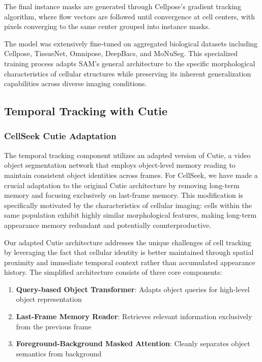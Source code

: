 \documentclass[../cellseek_paper.tex]{subfiles}
\begin{document}
The final instance masks are generated through Cellpose's gradient tracking algorithm, where flow vectors are followed until convergence at cell centers, with pixels converging to the same center grouped into instance masks.

The model was extensively fine-tuned on aggregated biological datasets including Cellpose, TissueNet, Omnipose, DeepBacs, and MoNuSeg. This specialized training process adapts SAM's general architecture to the specific morphological characteristics of cellular structures while preserving its inherent generalization capabilities across diverse imaging conditions.

\subsection{Temporal Tracking with Cutie}

\subsubsection{CellSeek Cutie Adaptation}

The temporal tracking component utilizes an adapted version of Cutie, a video object segmentation network that employs object-level memory reading to maintain consistent object identities across frames. For CellSeek, we have made a crucial adaptation to the original Cutie architecture by removing long-term memory and focusing exclusively on last-frame memory. This modification is specifically motivated by the characteristics of cellular imaging: cells within the same population exhibit highly similar morphological features, making long-term appearance memory redundant and potentially counterproductive.

Our adapted Cutie architecture addresses the unique challenges of cell tracking by leveraging the fact that cellular identity is better maintained through spatial proximity and immediate temporal context rather than accumulated appearance history. The simplified architecture consists of three core components:

\begin{enumerate}
  \item \textbf{Query-based Object Transformer}: Adapts object queries for high-level object representation
  \item \textbf{Last-Frame Memory Reader}: Retrieves relevant information exclusively from the previous frame
  \item \textbf{Foreground-Background Masked Attention}: Cleanly separates object semantics from background
\end{enumerate}
\end{document}
